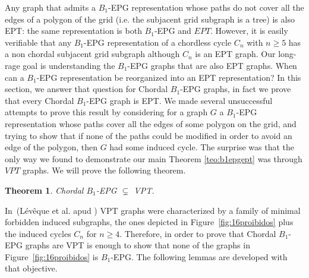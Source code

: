 \documentclass[9pt]{entcs}
\newtheorem{teo}{Theorem}[section]
\begin{document}
 Any graph that
admits a $B_1$-EPG representation  whose paths do not cover all the edges of a polygon of the grid (i.e.
the subjacent grid subgraph is a tree)  is also EPT: the same representation is both $B_1$-EPG and $EPT$.
However, it is easily verifiable that any $B_1$-EPG representation of a chordless cycle $C_n$ with $n\geq 5$
has a non chordal subjacent grid subgraph although $C_n$ is an  EPT graph.  Our long-rage goal is 
understanding the $B_1$-EPG graphs that are also EPT graphs. When can a $B_1$-EPG representation
be reorganized into an EPT representation?  In this section,
 we answer that question for Chordal $B_1$-EPG graphs, in fact we prove that every Chordal $B_1$-EPG graph is EPT. We
 made several unsuccessful attempts to prove this result by considering for a graph $G$ a $B_1$-EPG representation whose paths cover all the edges
 of some polygon on the grid, and trying  to show  that if none of the paths could be modified in order to avoid an edge of the polygon,
 then $G$ had some induced cycle. The surprise was that the only way we found to demonstrate our main Theorem \ref{teo:b1epgept} was through $VPT$ graphs.
 We will prove the following theorem.

\begin{teo}\label{teo:chordalB1inVPT}
Chordal $B_1$-EPG $\subsetneq$ VPT. 
\end{teo}

In~(L{\'e}v{\^e}que et al. \cite{leveque2009characterizing} apud \cite{alcon2015characterizing})  VPT graphs were characterized by a family of minimal forbidden induced subgraphs,
the ones depicted in 
Figure~\ref{fig:16proibidos} plus the induced cycles $C_n$ for $n\geq 4$. Therefore, in order to prove
that Chordal $B_1$-EPG graphs are VPT is enough to show that none of the graphs in Figure~\ref{fig:16proibidos} 
is $B_1$-EPG. The following lemmas are developed with that objective.   



 

\end{document}
